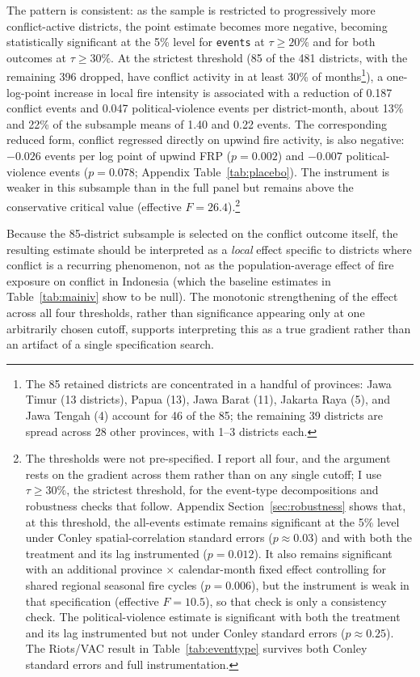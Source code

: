 \documentclass[12pt]{article}
\begin{document}
The pattern is consistent: as the sample is restricted to progressively more conflict-active districts, the point estimate becomes more negative, becoming statistically significant at the 5\% level for \texttt{events} at $\tau \geq 20\%$ and for both outcomes at $\tau \geq 30\%$. At the strictest threshold (85 of the 481 districts, with the remaining 396 dropped, have conflict activity in at least 30\% of months\footnote{The 85 retained districts are concentrated in a handful of provinces: Jawa Timur (13 districts), Papua (13), Jawa Barat (11), Jakarta Raya (5), and Jawa Tengah (4) account for 46 of the 85; the remaining 39 districts are spread across 28 other provinces, with 1--3 districts each.}), a one-log-point increase in local fire intensity is associated with a reduction of 0.187 conflict events and 0.047 political-violence events per district-month, about 13\% and 22\% of the subsample means of 1.40 and 0.22 events. The corresponding reduced form, conflict regressed directly on upwind fire activity, is also negative: $-0.026$ events per log point of upwind FRP ($p=0.002$) and $-0.007$ political-violence events ($p=0.078$; Appendix Table~\ref{tab:placebo}). The instrument is weaker in this subsample than in the full panel but remains above the conservative critical value (effective $F = 26.4$).\footnote{The thresholds were not pre-specified. I report all four, and the argument rests on the gradient across them rather than on any single cutoff; I use $\tau \geq 30\%$, the strictest threshold, for the event-type decompositions and robustness checks that follow. Appendix Section~\ref{sec:robustness} shows that, at this threshold, the all-events estimate remains significant at the 5\% level under Conley spatial-correlation standard errors ($p \approx 0.03$) and with both the treatment and its lag instrumented ($p=0.012$). It also remains significant with an additional province $\times$ calendar-month fixed effect controlling for shared regional seasonal fire cycles ($p=0.006$), but the instrument is weak in that specification (effective $F = 10.5$), so that check is only a consistency check. The political-violence estimate is significant with both the treatment and its lag instrumented but not under Conley standard errors ($p \approx 0.25$). The Riots/VAC result in Table~\ref{tab:eventtype} survives both Conley standard errors and full instrumentation.}

Because the 85-district subsample is selected on the conflict outcome itself, the resulting estimate should be interpreted as a \emph{local} effect specific to districts where conflict is a recurring phenomenon, not as the population-average effect of fire exposure on conflict in Indonesia (which the baseline estimates in Table~\ref{tab:mainiv} show to be null). The monotonic strengthening of the effect across all four thresholds, rather than significance appearing only at one arbitrarily chosen cutoff, supports interpreting this as a true gradient rather than an artifact of a single specification search.
\end{document}
